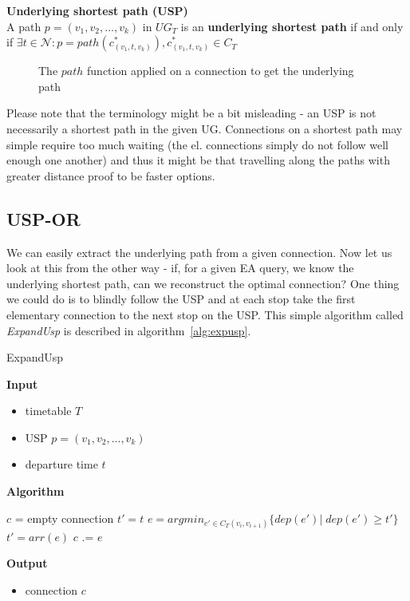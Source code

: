 	\begin{definition}
        \textbf{Underlying shortest path (USP)} \\
		A path $p = (v_{1}, v_{2}, ..., v_{k})$ in $UG_{T}$ is an \textbf{underlying shortest path} if and only if $\exists t \in \mathcal{N}: p = path(c_{(v_{1}, t, v_{k})}^{*}), c_{(v_{1}, t, v_{k})}^{*} \in C_{T}$
    \end{definition}
    
    \begin{figure}[h!]
		\begin{center}
		\end{center}
		\caption{\label{fig:pathfunc} The $path$ function applied on a connection to get the underlying path}
	\end{figure}
	
	\noindent Please note that the terminology might be a bit misleading - an USP is not necessarily a shortest path in the given UG. Connections on a shortest path may simple require too much waiting (the el. connections simply do not follow well enough one another) and thus it might be that travelling along the paths with greater distance proof to be faster options.
	    
\subsection{USP-OR}

	We can easily extract the underlying path from a given connection. Now let us look at this from the other way - if, for a given EA query, we know the underlying shortest path, can we reconstruct the optimal connection? One thing we could do is to blindly follow the USP and at each stop take the first elementary connection to the next stop on the USP. This simple algorithm called \textit{ExpandUsp} is described in algorithm~\ref{alg:expusp}. 
	
	\color{algcolor}
	\begin{algorithm}[H]
		\color{inalgcolor}
		\caption{ExpandUsp}
		\label{alg:expusp}
		\textbf{Input} 
		\begin{itemize}
			\item timetable $T$
			\item USP $p = (v_{1}, v_{2}, ..., v_{k})$
			\item departure time $t$
		\end{itemize}
		\textbf{Algorithm}
		\begin{algorithmic}
			\STATE $c$ = empty connection
			\STATE $t' = t$
				\STATE $e = argmin_{e' \in C_{T}(v_{i}, v_{i + 1})} \{dep(e')|\; dep(e') \geq t'\}$ 
				\STATE $t' = arr(e)$
				\STATE $c$ .= $e$ 
			\ENDFOR
		\end{algorithmic}
		\textbf{Output}
		\begin{itemize}
			\item connection $c$
		\end{itemize}
	\end{algorithm}
	\color{black}	
	
